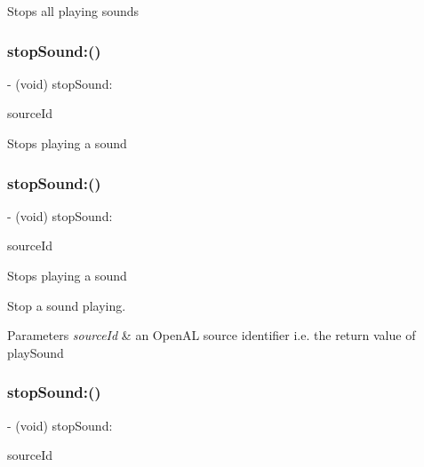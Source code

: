 Stops all playing sounds \mbox{\label{interfaceCDSoundEngine_ae2bbd23eefecd32afcf6bc0109b5e7a2}} 
\subsubsection{\texorpdfstring{stop\+Sound\+:()}{stopSound:()}\hspace{0.1cm}{\footnotesize\ttfamily [1/4]}}
{\footnotesize\ttfamily -\/ (void) stop\+Sound\+: \begin{DoxyParamCaption}\item[{(A\+Luint)}]{source\+Id }\end{DoxyParamCaption}}

Stops playing a sound \mbox{\label{interfaceCDSoundEngine_ae2bbd23eefecd32afcf6bc0109b5e7a2}} 
\subsubsection{\texorpdfstring{stop\+Sound\+:()}{stopSound:()}\hspace{0.1cm}{\footnotesize\ttfamily [2/4]}}
{\footnotesize\ttfamily -\/ (void) stop\+Sound\+: \begin{DoxyParamCaption}\item[{(A\+Luint)}]{source\+Id }\end{DoxyParamCaption}}

Stops playing a sound

Stop a sound playing. 
\begin{DoxyParams}{Parameters}
{\em source\+Id} & an Open\+AL source identifier i.\+e. the return value of play\+Sound \\
\hline
\end{DoxyParams}
\mbox{\label{interfaceCDSoundEngine_ae2bbd23eefecd32afcf6bc0109b5e7a2}} 
\subsubsection{\texorpdfstring{stop\+Sound\+:()}{stopSound:()}\hspace{0.1cm}{\footnotesize\ttfamily [3/4]}}
{\footnotesize\ttfamily -\/ (void) stop\+Sound\+: \begin{DoxyParamCaption}\item[{(A\+Luint)}]{source\+Id }\end{DoxyParamCaption}}

